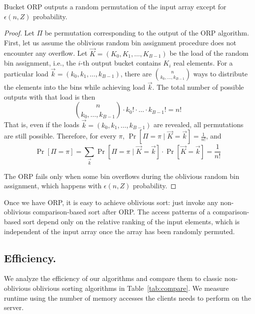 \begin{lemma}
Bucket ORP outputs a random permutation of the input array except for $\epsilon(n,Z)$ probability.
\end{lemma}
\begin{proof}
Let $\Pi$ be permutation corresponding to the output of the ORP algorithm.
First, let us assume the oblivious random bin assignment procedure does not encounter any overflow.
Let $\vec{K} = (K_0, K_1, \ldots, K_{B-1})$ be the load of the random bin assignment,
i.e., the $i$-th output bucket contains $K_i$ real elements. 
For a particular load $\vec{k}=(k_0, k_1, \ldots, k_{B-1})$, there are ${n \choose k_0,\ldots,k_{B-1}}$ ways to distribute the elements into the bins while achieving load $\vec{k}$.
The total number of possible outputs with that load is then
\[{n \choose k_0,\ldots,k_{B-1}} \cdot k_0! \cdot \ldots \cdot k_{B-1}! = n!\]
That is, even if the loads $\vec{k}=(k_0, k_1, \ldots, k_{B-1})$ are revealed, all permutations are still possible.
Therefore, for every $\pi$, $\Pr\left[\Pi = \pi \mid \vec{K}=\vec{k} \right] = \frac 1 {n!}$, and
\[ \Pr\left[\Pi = \pi\right] = \sum_{\vec{k}} \Pr\left[\Pi = \pi \mid \vec{K}=\vec{k} \right] \cdot \Pr\left[\vec{K}=\vec{k}\right] = \frac {1}{n!} \]

The ORP fails only when some bin overflows during the oblivious random bin assignment, which happens with $\epsilon(n,Z)$ probability.
\end{proof}

Once we have ORP, it is easy to achieve oblivious sort: just invoke any non-oblivious comparison-based sort after ORP.
The access patterns of a comparison-based sort depend only on the relative ranking of the input elements, which is independent of the input array once the array has been randomly permuted.

\subsection{Efficiency.}
\label{sec:efficiency}

We analyze the efficiency of our algorithms and compare them to classic non-oblivious oblivious sorting algorithms in Table~\ref{tab:compare}.
We measure runtime using the number of memory accesses the clients needs to perform on the server.





